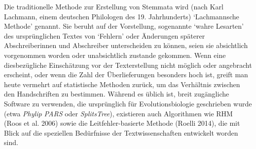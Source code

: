 \documentclass{article}
\begin{document}
        Die traditionelle Methode zur Erstellung von Stemmata wird (nach Karl Lachmann,
                  einem deutschen Philologen des 19. Jahrhunderts) ‘Lachmannsche Methode’ genannt.
                  Sie beruht auf der Vorstellung, sogenannte ‘wahre Lesarten’ des ursprünglichen
                  Textes von ‘Fehlern’ oder Änderungen späterer Abschreiberinnen und Abschreiber
                  unterscheiden zu können, seien sie absichtlich vorgenommen worden oder
                  unabsichtlich zustande gekommen. Wenn eine diesbezügliche Einschätzung vor der
                  Texterstellung nicht möglich oder angebracht erscheint, oder wenn die Zahl der
                  Überlieferungen besonders hoch ist, greift man heute vermehrt auf statistische
                  Methoden zurück, um das Verhältnis zwischen den Handschriften zu bestimmen.
                  Während es üblich ist, breit zugängliche Software zu verwenden, die ursprünglich
                  für Evolutionsbiologie geschrieben wurde (etwa \emph{Phylip
                        PARS} oder \emph{SplitsTree}), existieren auch
                  Algorithmen wie RHM (Roos et al. 2006) sowie die Leitfehler-basierte
                  Methode (Roelli 2014), die mit Blick auf die speziellen Bedürfnisse
                  der Textwissenschaften entwickelt worden sind.\\
            
\end{document}
